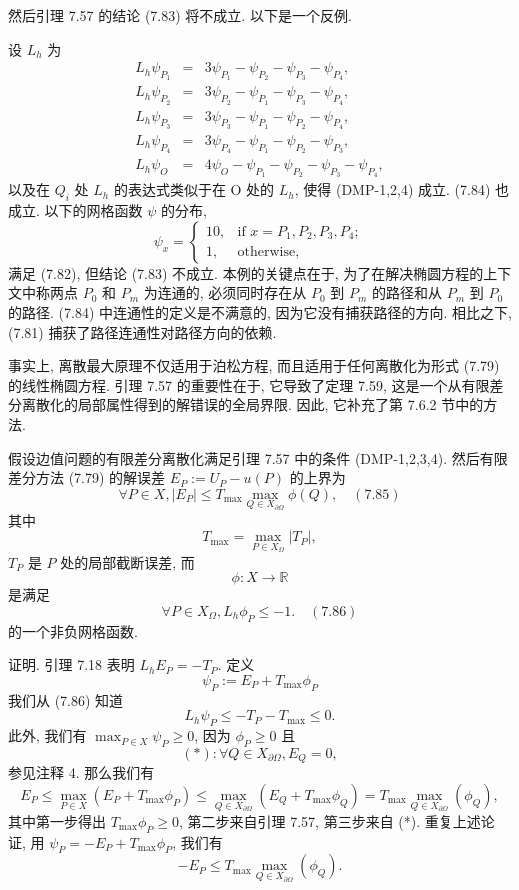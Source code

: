 \documentclass[a4paper]{ctexart}
\newcommand{\hl}[1]
{\noindent {\bf {#1}}}
\begin{document}
{然后引理 7.57 的结论 (7.83) 将不成立. 以下是一个反例. 

设 $L_h$ 为
\begin{eqnarray*}
L_h\psi_{P_1} &=& 3\psi_{P_1} - \psi_{P_2} - \psi_{P_3} - \psi_{P_4}, \\
L_h\psi_{P_2} &=& 3\psi_{P_2} - \psi_{P_1} - \psi_{P_3} - \psi_{P_4},\\
L_h\psi_{P_3} &=& 3\psi_{P_3} - \psi_{P_1} - \psi_{P_2} - \psi_{P_4}, \\
L_h\psi_{P_4} &=& 3\psi_{P_4} - \psi_{P_1} - \psi_{P_2} - \psi_{P_3}, \\
L_h\psi_{O} &=& 4\psi_{O} - \psi_{P_1} - \psi_{P_2} - \psi_{P_3} - \psi_{P_4},
\end{eqnarray*}
以及在 $Q_i$ 处 $L_h$ 的表达式类似于在 O 处的 $L_h$, 
使得 (DMP-1,2,4) 成立. (7.84) 也成立. 以下的网格函数 $\psi$ 的分布,
$$
\psi_x =
\begin{cases}
10, & \text{if } x = P_1, P_2, P_3, P_4; \\
1, & \text{otherwise},
\end{cases}
$$
满足 (7.82), 但结论 (7.83) 不成立. 
本例的关键点在于, 为了在解决椭圆方程的上下文中称两点 $P_0$ 和 $P_m$ 为连通的, 
必须同时存在从 $P_0$ 到 $P_m$ 的路径和从 $P_m$ 到 $P_0$ 的路径. 
(7.84) 中连通性的定义是不满意的, 因为它没有捕获路径的方向. 
相比之下, (7.81) 捕获了路径连通性对路径方向的依赖. 

事实上, 离散最大原理不仅适用于泊松方程, 而且适用于任何离散化为形式 (7.79) 的线性椭圆方程. 
引理 7.57 的重要性在于, 它导致了定理 7.59, 
这是一个从有限差分离散化的局部属性得到的解错误的全局界限. 
因此, 它补充了第 7.6.2 节中的方法. 

\hl{定理 7.59} 假设边值问题的有限差分离散化满足引理 7.57 中的条件 (DMP-1,2,3,4). 
然后有限差分方法 (7.79) 的解误差 $E_P := U_P - u(P)$ 的上界为
$$
\forall P \in X, |E_P | \leq T_{\text{max}} 
\max_{Q\in X_{\partial\Omega}}\phi(Q), \quad (7.85)
$$
其中 
$$
T_{\text{max}} = \max_{P \in X_{\Omega}}|T_P|,
$$
$T_P$ 是 $P$ 处的局部截断误差, 而 
$$
\phi : X \rightarrow \mathbb{R}
$$ 
是满足
$$
\forall P \in X_{\Omega}, L_h\phi_P \leq -1. \quad (7.86)
$$
的一个非负网格函数.

证明. 引理 7.18 表明 $L_hE_P = -T_P$. 定义
$$
\psi_P := E_P + T_{\text{max}}\phi_P
$$
我们从 (7.86) 知道
$$
L_h\psi_P \leq -T_P - T_{\text{max}} \leq 0.
$$
此外, 我们有 $\max_{P \in X} \psi_P \geq 0$, 
因为 $\phi_P \geq 0$ 且
$$
(*) : \forall Q \in X_{\partial\Omega}, E_Q = 0,
$$
参见注释 4. 那么我们有
$$
E_P \leq \max_{P \in X}(E_P + T_{\text{max}}\phi_P) 
\leq \max_{Q\in X_{\partial\Omega}}(E_Q + T_{\text{max}}\phi_Q) 
= T_{\text{max}} \max_{Q\in X_{\partial\Omega}}(\phi_Q), 
$$
其中第一步得出 $T_{\text{max}}\phi_P \geq 0$, 
第二步来自引理 7.57, 第三步来自 (*). 
重复上述论证, 用 $\psi_P = -E_P + T_{\text{max}}\phi_P$, 我们有
$$
-E_P \leq T_{\text{max}} \max_{Q\in X_{\partial\Omega}}(\phi_Q).
$$

}
\end{document}
